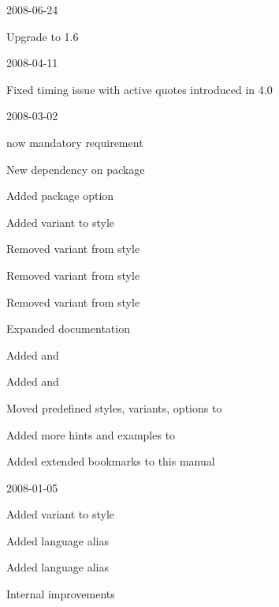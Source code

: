 \documentclass{ltxdockit}[2010/09/26]
\begin{document}
\begin{changelog}
\begin{release}{4.2}{2008-06-24}
\item Upgrade to  1.6
\end{release}

\begin{release}{4.1}{2008-04-11}
\item Fixed timing issue with active quotes introduced in 4.0
\end{release}

\begin{release}{4.0}{2008-03-02}
\item \etex now mandatory requirement
\item New dependency on  package
\item Added package option 
\item Added variant  to style 
\item Removed variant  from  style
\item Removed variant  from  style
\item Removed variant  from  style
\item Expanded documentation
\item Added  and 
\item Added  and 
\item Moved predefined styles, variants, options to 
\item Added more hints and examples to 
\item Added extended \pdf bookmarks to this manual
\end{release}

\begin{release}{3.8}{2008-01-05}
\item Added variant  to style 
\item Added language alias 
\item Added language alias 
\item Internal improvements
\end{release}


\end{changelog}
\end{document}
